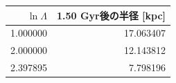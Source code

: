 \begin{tabular}{rr}\toprule
$\ln\Lambda$ & 1.50 Gyr後の半径 [kpc] \\
\midrule
1.000000 & 17.063407 \\
2.000000 & 12.143812 \\
2.397895 & 7.798196 \\
\bottomrule\end{tabular}
